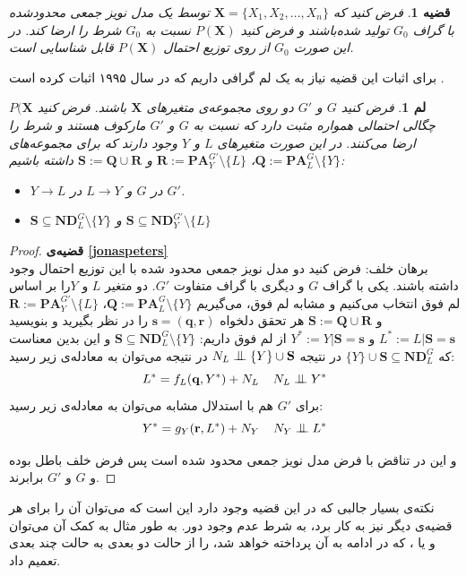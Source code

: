 \documentclass[a4paper,12pt]{article}
\newcommand{\bigCI}{\mathrel{\text{\scalebox{1.07}{$\perp\mkern-10mu\perp$}}}}
\newtheorem{lem}{{\large\bf لم}}[section]
\newtheorem{thm}{{\large\bf قضیه}}[section]
\begin{document}
\begin{thm}\label{jonaspeters}
	فرض کنید که 
	$\mathbf{X} = \{X_1, X_2, \dots, X_n\}$
	توسط یک مدل‌ نویز جمعی محدود‌شده با گراف $G_0$ تولید شده‌باشند و فرض کنید 
	$P(\mathbf{X})$
	نسبت به $G_0$ شرط 
	را ارضا کند. در این صورت $G_0$ از روی توزیع احتمال $P(\mathbf{X})$ قابل شناسایی است. 
\end{thm}
برای اثبات این قضیه نیاز به یک لم‌ گرافی داریم که 
در سال ۱۹۹۵ اثبات کرده است 
\cite{chickering}.
\begin{lem}
	فرض کنید $G$ و $G'$ دو 
	روی مجموعه‌ی متغیر‌های  
	$\mathbf{X}$
	باشند. فرض کنید 
	$P(\mathbf{X}$
	چگالی احتمالی همواره مثبت دارد که نسبت به $G$ و   $G'$ مارکوف هستند و شرط
	را ارضا می‌کنند. در این صورت متغیر‌های $L$ و $Y$  وجود دارند که برای مجموعه‌های 
	$\mathbf{Q} := \mathbf{PA}_L^{G}\setminus\{Y\}$،
	$\mathbf{R} := \mathbf{PA}_Y^{G'}\setminus\{L\}$
	و 
	$\mathbf{S} := \mathbf{Q} \cup \mathbf{R} $
	داشته باشیم:
	\begin{itemize}
		\item
		$Y \rightarrow L$
		در $G$ و 
		$L \rightarrow Y$
		در $G'$.
		\item 
		$\mathbf{S} \subseteq \mathbf{ND}_L^G \setminus\{Y\}$
		و 
		$\mathbf{S}\subseteq  \mathbf{ND}_Y^{G'} \setminus\{L\} $ 
	\end{itemize}
\end{lem}
\vspace{0.5cm}
\begin{proof}
	\textbf{
قضیه‌ی 
		\eqref{jonaspeters}}
	\\
	برهان خلف:‌  فرض کنید دو مدل نویز جمعی محدود شده با این توزیع احتمال وجود داشته باشند. یکی با گراف $G$ و دیگری با  گراف  متفاوت $G'$. دو متغیر $L$ و $Y$را بر اساس لم فوق انتخاب می‌کنیم و مشابه لم فوق، می‌گیریم
	$\mathbf{Q} := \mathbf{PA}_L^{G}\setminus\{Y\}$،
	$\mathbf{R} := \mathbf{PA}_Y^{G'}\setminus\{L\}$
	و 
	$\mathbf{S} := \mathbf{Q} \cup \mathbf{R} $
	هر تحقق دلخواه 
	$\mathbf{s} = (\mathbf{q}, \mathbf{r})$
	را در نظر بگیرید و بنویسید
	$L^* := L|\mathbf{S}= \mathbf{s}$
	و 
	$Y^* := Y|\mathbf{S}= \mathbf{s}$
	از لم فوق داریم:
	$\mathbf{S} \subseteq \mathbf{ND}_L^G \setminus\{Y\}$
	و این بدین معناست که 
	$\{Y\} \cup \mathbf{S}  \subseteq \mathbf{ND}_L^G$
	در نتیجه 
	$N_L \bigCI \{Y\} \cup \mathbf{S}$
	در نتیجه می‌توان به معادله‌ی زیر رسید:
	$$L^* = f_L(\mathbf{q}, Y^*) + N_L \;\;\;\; N_L\bigCI Y^*$$
	برای $G'$ هم با استدلال مشابه می‌توان به معادله‌ی زیر رسید:
	$$Y^* = g_Y(\mathbf{r}, L^*) + N_Y \;\;\;\; N_Y\bigCI L^*$$
	
	و این در تناقض با فرض مدل نویز جمعی محدود شده است پس فرض خلف باطل بوده و $G$ و $G'$ برابرند.
\end{proof}
نکته‌ی بسیار جالبی که در این قضیه وجود دارد این است که می‌توان آن را برای هر قضیه‌ی 
دیگر نیز به کار برد، به شرط عدم وجود دور. به طور مثال به کمک آن می‌توان
و یا
،
که در ادامه به آن پرداخته خواهد شد، را از حالت دو بعدی به حالت چند بعدی تعمیم داد.
\end{document}
